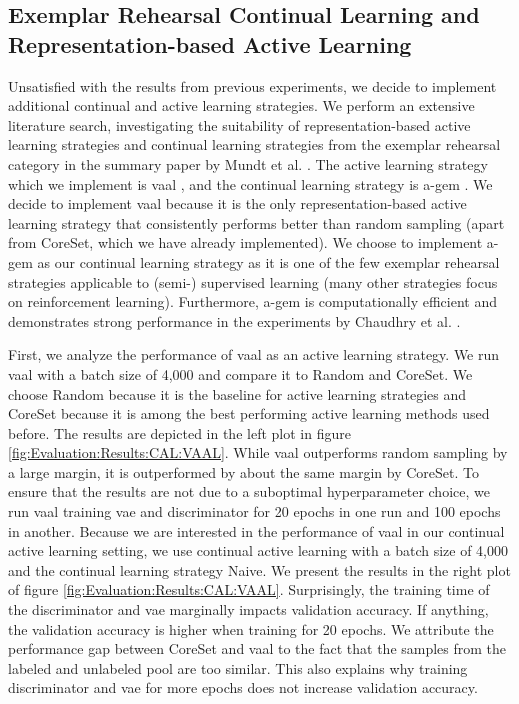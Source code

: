 \subsection{Exemplar Rehearsal Continual Learning and Representation-based Active Learning}
\label{sec:Evaluation:CAL:VAAL_AGEM}
Unsatisfied with the results from previous experiments, we decide to implement additional continual and active learning strategies. We perform an extensive literature search,
investigating the suitability of representation-based active learning strategies and continual learning strategies from the exemplar rehearsal category in the summary paper
by Mundt et al. \cite{mundt2020wholistic}. The active learning strategy which we implement is \gls{vaal} \cite{sinha2019variational}, and the continual learning strategy is
\gls{a-gem} \cite{chaudhry2018efficient}. We decide to implement \gls{vaal} because it is the only representation-based active learning strategy that consistently performs
better than random sampling (apart from CoreSet, which we have already implemented). We choose to implement \gls{a-gem} as our continual learning strategy as it
is one of the few exemplar rehearsal strategies applicable to (semi-) supervised learning (many other strategies focus on reinforcement learning). Furthermore, \gls{a-gem}
is computationally efficient and demonstrates strong performance in the experiments by Chaudhry et al. \cite{chaudhry2018efficient}. \par
First, we analyze the performance of \gls{vaal} as an active learning strategy. We run \gls{vaal} with a batch size of 4,000 and compare it to Random and CoreSet. We choose
Random because it is the baseline for active learning strategies and CoreSet because it is among the best performing active learning methods used before. The results
are depicted in the left plot in figure \ref{fig:Evaluation:Results:CAL:VAAL}. While \gls{vaal} outperforms random sampling by a large margin, it is outperformed by about the
same margin by CoreSet. To ensure that the results are not due to a suboptimal hyperparameter choice, we run \gls{vaal} training \gls{vae} and discriminator for 20 epochs in
one run and 100 epochs in another. Because we are interested in the performance of \gls{vaal} in our continual active learning setting, we use continual active learning with
a batch size of 4,000 and the continual learning strategy Naive. We present the results in the right plot of figure \ref{fig:Evaluation:Results:CAL:VAAL}.
Surprisingly, the training time of the discriminator and \gls{vae} marginally impacts validation accuracy. If anything, the validation accuracy is higher when training for
20 epochs. We attribute the performance gap between CoreSet and \gls{vaal} to the fact that the samples from the labeled and unlabeled pool are too similar. This also
explains why training discriminator and \gls{vae} for more epochs does not increase validation accuracy. \par

